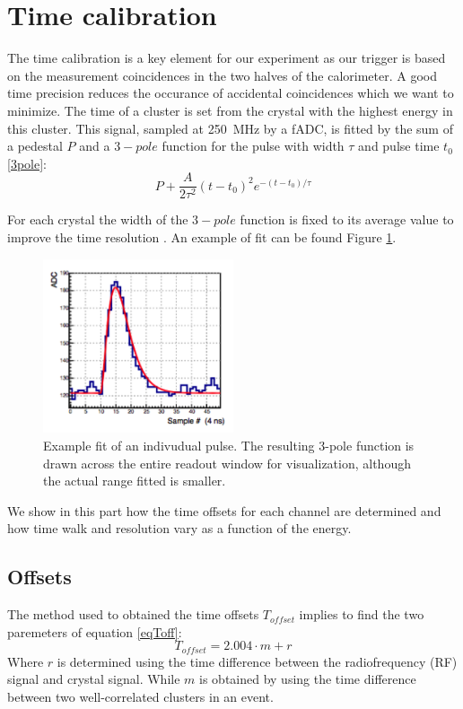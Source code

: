 \documentclass[review]{elsarticle}
\begin{document}
\section{Time calibration}

The time calibration is a key element for our experiment as our trigger is 
based on the measurement coincidences in the two halves of the calorimeter. 
A good time precision reduces the occurance of accidental coincidences which 
we want to minimize. The time of a cluster is set from the crystal with the 
highest energy in this cluster. This signal, sampled at 250~MHz by a fADC, is 
fitted by the sum of a pedestal $P$ and a $3-pole$ function for the pulse with 
width $\tau$ and pulse time $t_{0}$ \ref{3pole}:
\begin{equation}
P + \frac{A}{2 \tau^{2}} \left( t-t_{0} \right)^{2} e^{- \left( t-t_{0} \right) / \tau}
\label{3pole}
\end{equation}

For each crystal the width of the $3-pole$ function is fixed to its average value to improve the time resolution \cite{NathansNote}. An example of fit can be found Figure \ref{PulseFit}.

\begin{figure}[ht!]
\centering
\includegraphics[width=0.50\textwidth]{pulseFit.png}
\caption{Example fit of an indivudual pulse. The resulting 3-pole function is drawn across the entire readout window for visualization, although the actual range fitted is smaller.}
\label{PulseFit}
\end{figure}

We show in this part how the time offsets for each channel are
determined and how time walk and resolution vary as a function 
of the energy.


\subsection{Offsets}
The method used to obtained the time offsets $T_{offset}$ implies to find the two paremeters of equation \ref{eqToff}:
\begin{equation}
T_{offset} = 2.004 \cdot m + r
\label{eqToff}
\end{equation}
Where $r$ is determined using the time difference between the radiofrequency (RF)
signal and crystal signal. While $m$ is obtained by using the time difference between two well-correlated clusters in an event. 
\end{document}
